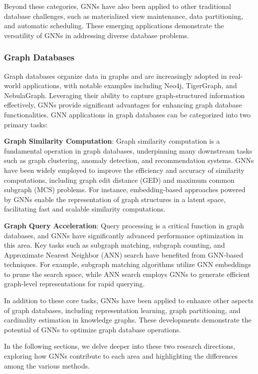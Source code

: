 Beyond these categories, GNNs have also been applied to other traditional database challenges, such as materialized view maintenance, data partitioning, and automatic scheduling. These emerging applications demonstrate the versatility of GNNs in addressing diverse database problems.  


\subsubsection{Graph Databases}  
Graph databases organize data in graphs and are increasingly adopted in real-world applications, with notable examples including Neo4j, TigerGraph, and NebulaGraph. Leveraging their ability to capture graph-structured information effectively, GNNs provide significant advantages for enhancing graph database functionalities. GNN applications in graph databases can be categorized into two primary tasks:  

\textbf{Graph Similarity Computation}: Graph similarity computation is a fundamental operation in graph databases, underpinning many downstream tasks such as graph clustering, anomaly detection, and recommendation systems. GNNs have been widely employed to improve the efficiency and accuracy of similarity computations, including graph edit distance (GED) and maximum common subgraph (MCS) problems. For instance, embedding-based approaches powered by GNNs enable the representation of graph structures in a latent space, facilitating fast and scalable similarity computations.  

\textbf{Graph Query Acceleration}: Query processing is a critical function in graph databases, and GNNs have significantly advanced performance optimization in this area. Key tasks such as subgraph matching, subgraph counting, and Approximate Nearest Neighbor (ANN) search have benefited from GNN-based techniques. For example, subgraph matching algorithms utilize GNN embeddings to prune the search space, while ANN search employs GNNs to generate efficient graph-level representations for rapid querying.  

In addition to these core tasks, GNNs have been applied to enhance other aspects of graph databases, including representation learning, graph partitioning, and cardinality estimation in knowledge graphs. These developments demonstrate the potential of GNNs to optimize graph database operations. 

In the following sections, we delve deeper into these two research directions, exploring how GNNs contribute to each area and highlighting the differences among the various methods.